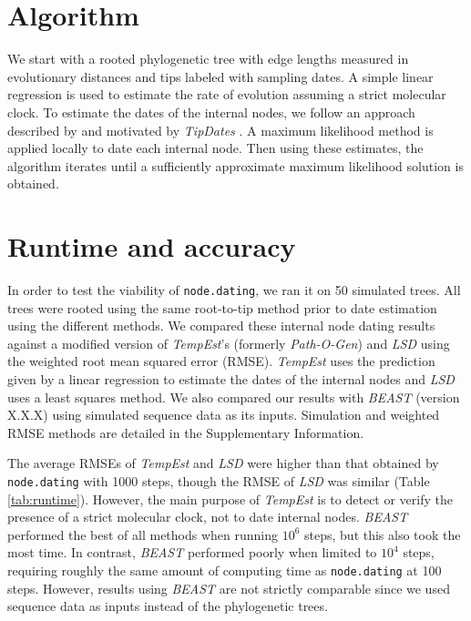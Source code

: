\documentclass{bioinfo}
\newcommand{\code}[1]{{\tt #1}}
\begin{document}
\section{Algorithm} \label{sec:alg}
We start with a rooted phylogenetic tree with edge lengths measured in evolutionary distances and tips labeled with sampling dates.
A simple linear regression is used to estimate the rate of evolution assuming a strict molecular clock.
To estimate the dates of the internal nodes, we follow an approach described by \cite{Felsenstein81} and motivated by \emph{TipDates} \citep{TipDates}.
A maximum likelihood method is applied locally to date each internal node.
Then using these estimates, the algorithm iterates until a sufficiently approximate maximum likelihood solution is obtained.

\section{Runtime and accuracy} \label{sec:tests}
In order to test the viability of \code{node.dating}, we ran it on 50 simulated trees.
All trees were rooted using the same root-to-tip method prior to date estimation using the different methods.
We compared these internal node dating results against a modified version of \emph{TempEst}'s (formerly \emph{Path-O-Gen}) and \emph{LSD} using the weighted root mean squared error (RMSE).
\emph{TempEst} uses the prediction given by a linear regression to estimate the dates of the internal nodes and \emph{LSD} uses a least squares method.
We also compared our results with \emph{BEAST} (version X.X.X) using simulated sequence data as its inputs.
Simulation and weighted RMSE methods are detailed in the Supplementary Information.

The average RMSEs of \emph{TempEst} and \emph{LSD} were higher than that obtained by \code{node.dating} with 1000 steps, though the RMSE of \emph{LSD} was similar (Table \ref{tab:runtime}).
However, the main purpose of \emph{TempEst} is to detect or verify the presence of a strict molecular clock, not to date internal nodes.
\emph{BEAST} performed the best of all methods when running $10^6$ steps, but this also took the most time.
In contrast, \emph{BEAST} performed poorly when limited to $10^4$ steps, requiring roughly the same amount of computing time as \code{node.dating} at 100 steps.
However, results using \emph{BEAST} are not strictly comparable since we used sequence data as inputs instead of the phylogenetic trees.
\end{document}
